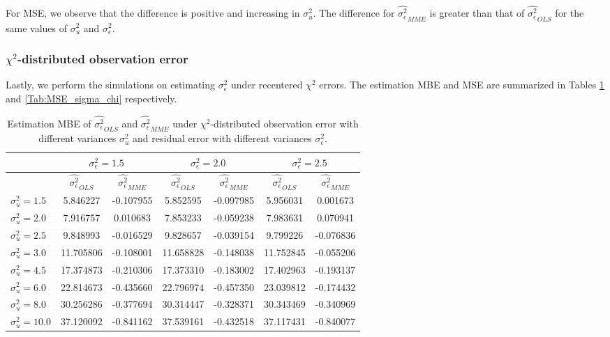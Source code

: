\documentclass{article}
\begin{document}
For MSE, we observe that the difference is positive and increasing in $\sigma^2_u$.
The difference for $\hat{\sigma^2_\epsilon}_{MME}$ is greater than that of $\hat{\sigma^2_\epsilon}_{OLS}$ for the same values of $\sigma^2_u$ and $\sigma^2_\epsilon$.

\subsubsection{$\chi^2$-distributed observation error}

Lastly, we perform the simulations on estimating $\sigma^2_\epsilon$ under recentered $\chi^2$ errors.
The estimation MBE and MSE are summarized in Tables \ref{Tab:MBE_sigma_chi} and \ref{Tab:MSE_sigma_chi} respectively.

\begin{table}[ht]
    \centering
    \caption{Estimation MBE of $\hat{\sigma^2_\epsilon}_{OLS}$ and $\hat{\sigma^2_\epsilon}_{MME}$ under $\chi^2$-distributed observation error with different variances $\sigma^2_u$ and residual error with different variances $\sigma^2_\epsilon$.}
    \label{Tab:MBE_sigma_chi}
    \begin{tabular}[t]{lcccccc}
        \hline
        &\multicolumn{2}{c}{$\sigma^2_\epsilon=1.5$}&\multicolumn{2}{c}{$\sigma^2_\epsilon=2.0$}&\multicolumn{2}{c}{$\sigma^2_\epsilon=2.5$}\\
        \hline
        &$\hat{\sigma^2_\epsilon}_{OLS}$&$\hat{\sigma^2_\epsilon}_{MME}$&$\hat{\sigma^2_\epsilon}_{OLS}$&
        $\hat{\sigma^2_\epsilon}_{MME}$&$\hat{\sigma^2_\epsilon}_{OLS}$&$\hat{\sigma^2_\epsilon}_{MME}$\\
        \hline
        $\sigma^2_u = 1.5$&5.846227&-0.107955&5.852595&-0.097985&5.956031&0.001673\\
        $\sigma^2_u = 2.0$&7.916757&0.010683&7.853233&-0.059238&7.983631&0.070941\\
        $\sigma^2_u = 2.5$&9.848993&-0.016529&9.828657&-0.039154&9.799226&-0.076836\\
        $\sigma^2_u = 3.0$&11.705806&-0.108001&11.658828&-0.148038&11.752845&-0.055206\\
        $\sigma^2_u = 4.5$&17.374873&-0.210306&17.373310&-0.183002&17.402963&-0.193137\\
        $\sigma^2_u = 6.0$&22.814673&-0.435660&22.796974&-0.457350&23.039812&-0.174432\\
        $\sigma^2_u = 8.0$&30.256286&-0.377694&30.314447&-0.328371&30.343469&-0.340969\\
        $\sigma^2_u = 10.0$&37.120092&-0.841162&37.539161&-0.432518&37.117431&-0.840077\\
        \hline
    \end{tabular}
\end{table}
\end{document}
